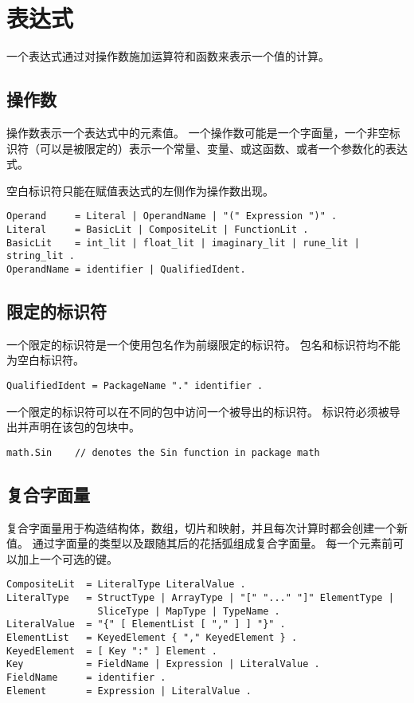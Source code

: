 \chapter{表达式}
一个表达式通过对操作数施加运算符和函数来表示一个值的计算。

\section{操作数}
操作数表示一个表达式中的元素值。
一个操作数可能是一个字面量，一个非空标识符（可以是被限定的）表示一个常量、变量、或这函数、或者一个参数化的表达式。

空白标识符只能在赋值表达式的左侧作为操作数出现。
\begin{lstlisting}[style=EBNF]
Operand     = Literal | OperandName | "(" Expression ")" .
Literal     = BasicLit | CompositeLit | FunctionLit .
BasicLit    = int_lit | float_lit | imaginary_lit | rune_lit | string_lit .
OperandName = identifier | QualifiedIdent.
\end{lstlisting}

\section{限定的标识符}
一个限定的标识符是一个使用包名作为前缀限定的标识符。
包名和标识符均不能为空白标识符。
\begin{lstlisting}[style=EBNF]
QualifiedIdent = PackageName "." identifier .
\end{lstlisting}
一个限定的标识符可以在不同的包中访问一个被导出的标识符。
标识符必须被导出并声明在该包的包块中。
\begin{lstlisting}[style=golang]
math.Sin	// denotes the Sin function in package math
\end{lstlisting}

\section{复合字面量}
复合字面量用于构造结构体，数组，切片和映射，并且每次计算时都会创建一个新值。
通过字面量的类型以及跟随其后的花括弧组成复合字面量。
每一个元素前可以加上一个可选的键。
\begin{lstlisting}[style=EBNF]
CompositeLit  = LiteralType LiteralValue .
LiteralType   = StructType | ArrayType | "[" "..." "]" ElementType |
                SliceType | MapType | TypeName .
LiteralValue  = "{" [ ElementList [ "," ] ] "}" .
ElementList   = KeyedElement { "," KeyedElement } .
KeyedElement  = [ Key ":" ] Element .
Key           = FieldName | Expression | LiteralValue .
FieldName     = identifier .
Element       = Expression | LiteralValue .
\end{lstlisting}

